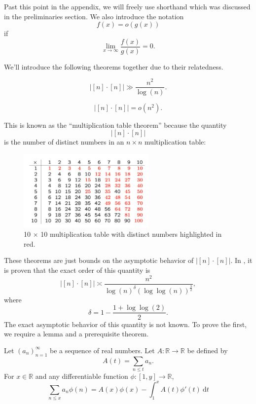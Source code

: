 \documentclass[12pt,reqno]{amsart}
\begin{document}
Past this point in the appendix, we will freely use shorthand which was discussed in the preliminaries
section. We also introduce the notation
\[
    f(x) = o(g(x))
\]
if
\[
    \lim_{x \to \infty} \frac{f(x)}{g(x)} = 0 
.\]

We'll introduce the following theorems together due to their relatedness.

\begin{theorem*}
\[
    \left\lvert [n] \cdot [n] \right\rvert \gg \frac{n ^{2}}{\log \left( n \right) }    
.\]
\end{theorem*}

\begin{theorem*}
\[
    \left\lvert [n] \cdot [n] \right\rvert = o(n^{2})
.\]
\end{theorem*}

This is known as the ``multiplication table theorem'' because the quantity
\[
    \left\lvert [n] \cdot [n] \right\rvert 
\]
is the number of distinct numbers in an \(n \times n\) multiplication table:

\begin{figure}[h]
    \centering
    \includegraphics[width=0.6\textwidth]{mult-table.png}
    \caption{10 \(\times \) 10 multiplication table with distinct numbers highlighted in red.}
\end{figure}

These theorems are just bounds on the asymptotic behavior of \(\left\lvert [n] \cdot [n] \right\rvert \). 
In \cite{Ford}, it is proven that the exact order of this quantity is
\[
    \left\lvert [n] \cdot [n] \right\rvert \asymp \frac{n^{2}}{\log \left( n \right) ^{\delta} \left( \log \log \left( n \right) \right) ^{\frac{3}{2} } } 
,\]
where
\[
    \delta = 1 - \frac{1 + \log \log \left( 2 \right)  }{2} 
.\]
The exact asymptotic behavior of this quantity is not known.
To prove the first, we require a lemma and a prerequisite theorem.

\begin{lemma*}
Let \(\left( a_{n}  \right) _{n = 1} ^{\infty }\) be a sequence of real numbers. Let \(A: \mathbb{R} \to \mathbb{R} \) be defined by
\[
    A(t) = \sum _{n \leq t} a_{n} 
.\]
For \(x \in \mathbb{R} \) and any differentiable function \(\phi : [1,y] \to \mathbb{R} \),
\[
    \sum _{n \leq x} a_{n} \phi(n) = A(x)\phi(x) - \int_{1}^{x} A(t)\phi'(t) ~\mathrm{d} t
\]
\end{lemma*}
\end{document}
